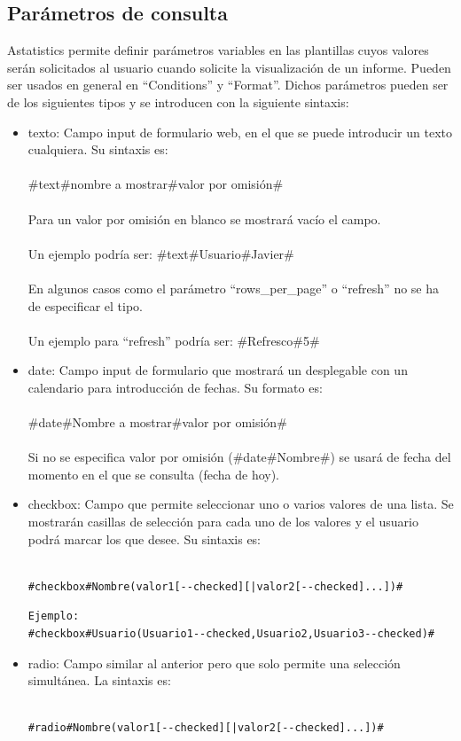 \documentclass[spanish,12pt]{book}
\begin{document}
\subsection{Parámetros de consulta}
Astatistics permite definir parámetros variables en las plantillas cuyos valores serán solicitados al usuario cuando solicite la visualización de un informe. Pueden ser usados en general en ``Conditions'' y ``Format''. Dichos parámetros pueden ser de los siguientes tipos y se introducen con la siguiente sintaxis:
\begin{itemize}
\item texto: Campo input de formulario web, en el que se puede introducir un texto cualquiera. Su sintaxis es:\\
	\\
	\#text\#nombre a mostrar\#valor por omisión\#\\
	\\
	Para un valor por omisión en blanco se mostrará vacío el campo.\\
	\\
	Un ejemplo podría ser: \#text\#Usuario\#Javier\#\\
	\\
	En algunos casos como el parámetro ``rows\_per\_page'' o ``refresh'' no se ha de especificar el tipo.\\
	\\
	Un ejemplo para ``refresh'' podría ser: \#Refresco\#5\#
\item date: Campo input de formulario que mostrará un desplegable con un calendario para introducción de fechas. Su formato es:\\
	\\
	\#date\#Nombre a mostrar\#valor por omisión\# \\
	\\
	Si no se especifica valor por omisión (\#date\#Nombre\#) se usará de fecha del momento en el que se consulta (fecha de hoy).
\item checkbox: Campo que permite seleccionar uno o varios valores de una lista. Se mostrarán casillas de selección para cada uno de los valores y el usuario podrá marcar los que desee. Su sintaxis es:\\
	\\
\begin{lstlisting}
#checkbox#Nombre(valor1[--checked][|valor2[--checked]...])#
\end{lstlisting}
	
\begin{lstlisting}
Ejemplo:
#checkbox#Usuario(Usuario1--checked,Usuario2,Usuario3--checked)#
\end{lstlisting}
\item radio: Campo similar al anterior pero que solo permite una selección simultánea. La sintaxis es:\\
	\\
\begin{lstlisting}
#radio#Nombre(valor1[--checked][|valor2[--checked]...])#
\end{lstlisting}
	

\end{itemize}
\end{document}
